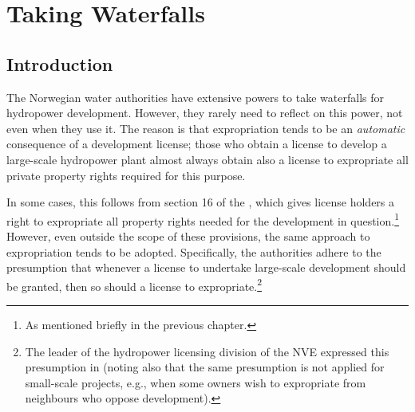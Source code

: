 \chapter{Taking Waterfalls}\label{chap:4}

\section{Introduction}\label{sec:intro4}



The Norwegian water authorities have extensive powers to take waterfalls for hydropower development. However, they rarely need to reflect on this power, not even when they use it. The reason is that expropriation tends to be an {\it automatic} consequence of a development license; those who obtain a license to develop a large-scale hydropower plant almost always obtain also a license to expropriate all private property rights required for this purpose. 

In some cases, this follows from section 16 of the \cite{wra17}, which gives license holders a right to expropriate all property rights needed for the development in question.\footnote{As mentioned briefly in the previous chapter.} However, even outside the scope of these provisions, the same approach to expropriation tends to be adopted. Specifically, the authorities adhere to the presumption that whenever a license to undertake large-scale development should be granted, then so should a license to expropriate.\footnote{The leader of the hydropower licensing division of the NVE expressed this presumption in  \cite{flatby08} (noting also that the same presumption is not applied for small-scale projects, e.g., when some owners wish to expropriate from neighbours who oppose development).} 

